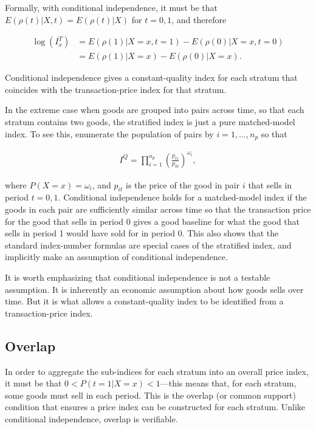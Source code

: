 \documentclass[]{article}
\begin{document}
Formally, with conditional independence, it must be that \(E(\rho(t) | X, t) = E(\rho(t) | X)\) for \(t = 0,1\), and therefore

\begin{align*}
\log(I^{T}_{x}) &= E(\rho(1) | X = x, t = 1) - E(\rho(0) | X = x, t = 0) \\
 &= E(\rho(1) | X = x) - E(\rho(0) | X = x).
\end{align*}

Conditional independence gives a constant-quality index for each stratum that coincides with the transaction-price index for that stratum.

In the extreme case when goods are grouped into pairs across time, so that each stratum contains two goods, the stratified index is just a pure matched-model index. To see this, enumerate the population of pairs by \(i = 1,\ldots, n_{p}\) so that

\begin{align*}
I^{Q} = \prod_{i = 1}^{n_{p}} \left(\frac{p_{i1}}{p_{i0}}\right)^{\omega_{i}},
\end{align*}

where \(P(X = x) = \omega_{i}\), and \(p_{it}\) is the price of the good in pair \(i\) that sells in period \(t = 0,1\). Conditional independence holds for a matched-model index if the goods in each pair are sufficiently similar across time so that the transaction price for the good that sells in period 0 gives a good baseline for what the good that sells in period 1 would have sold for in period 0. This also shows that the standard index-number formulas are special cases of the stratified index, and implicitly make an assumption of conditional independence.

It is worth emphasizing that conditional independence is not a testable assumption. It is inherently an economic assumption about how goods sells over time. But it is what allows a constant-quality index to be identified from a transaction-price index.

\hypertarget{overlap}{%
\subsection{Overlap}\label{overlap}}

In order to aggregate the sub-indices for each stratum into an overall price index, it must be that \(0 < P(t = 1 | X = x) < 1\)---this means that, for each stratum, some goods must sell in each period. This is the overlap (or common support) condition that ensures a price index can be constructed for each stratum. Unlike conditional independence, overlap is verifiable.
\end{document}
